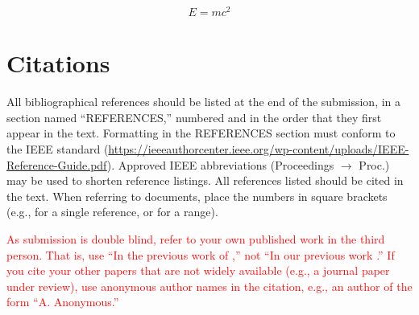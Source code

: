 \documentclass{article}
\begin{document}
\begin{equation}\label{relativity}
E=mc^{2}
\end{equation}

\section{Citations}

All bibliographical references should be listed at the end of the submission, in a section named ``REFERENCES,''
numbered and in the order that they first appear in the text. Formatting in the REFERENCES section must conform to the
IEEE standard (\url{https://ieeeauthorcenter.ieee.org/wp-content/uploads/IEEE-Reference-Guide.pdf}). Approved
IEEE abbreviations (Proceedings $\rightarrow$ Proc.) may be used to shorten reference listings. All references listed
should be cited in the text. When referring to documents, place the numbers in square brackets (e.g., \cite{ISMIR17Author:01}
for a single reference, or \cite{JNMR10Someone:01,Book20Person:01,Chapter09Person:01} for a range).

\textcolor{red}{As submission is double blind, refer to your own published work in the third person. That is, use ``In the previous work of \cite{ISMIR17Author:01},'' not ``In our previous work \cite{ISMIR17Author:01}.'' If you cite your other papers that are not widely available (e.g., a journal paper under review), use anonymous author names in the citation, e.g., an author of the form ``A. Anonymous.''}



%
%
%
%
%
\end{document}
